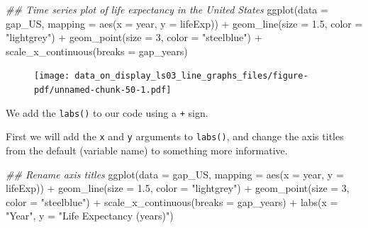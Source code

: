 \documentclass[
  letterpaper,
  DIV=11,
  numbers=noendperiod]{scrreprt}
\newenvironment{Shaded}{\begin{snugshade}}{\end{snugshade}}
\newcommand{\AttributeTok}[1]{\textcolor[rgb]{0.40,0.45,0.13}{#1}}
\newcommand{\DecValTok}[1]{\textcolor[rgb]{0.68,0.00,0.00}{#1}}
\newcommand{\DocumentationTok}[1]{\textcolor[rgb]{0.37,0.37,0.37}{\textit{#1}}}
\newcommand{\FloatTok}[1]{\textcolor[rgb]{0.68,0.00,0.00}{#1}}
\newcommand{\FunctionTok}[1]{\textcolor[rgb]{0.28,0.35,0.67}{#1}}
\newcommand{\NormalTok}[1]{\textcolor[rgb]{0.00,0.23,0.31}{#1}}
\newcommand{\SpecialCharTok}[1]{\textcolor[rgb]{0.37,0.37,0.37}{#1}}
\newcommand{\StringTok}[1]{\textcolor[rgb]{0.13,0.47,0.30}{#1}}
\begin{document}
\begin{Shaded}
\begin{Highlighting}[]
\DocumentationTok{\#\# Time series plot of life expectancy in the United States}
\FunctionTok{ggplot}\NormalTok{(}\AttributeTok{data =}\NormalTok{ gap\_US, }
       \AttributeTok{mapping =} \FunctionTok{aes}\NormalTok{(}\AttributeTok{x =}\NormalTok{ year, }
                     \AttributeTok{y =}\NormalTok{ lifeExp)) }\SpecialCharTok{+}
  \FunctionTok{geom\_line}\NormalTok{(}\AttributeTok{size =} \FloatTok{1.5}\NormalTok{, }
            \AttributeTok{color =} \StringTok{"lightgrey"}\NormalTok{) }\SpecialCharTok{+}
  \FunctionTok{geom\_point}\NormalTok{(}\AttributeTok{size =} \DecValTok{3}\NormalTok{, }
             \AttributeTok{color =} \StringTok{"steelblue"}\NormalTok{) }\SpecialCharTok{+}
  \FunctionTok{scale\_x\_continuous}\NormalTok{(}\AttributeTok{breaks =}\NormalTok{ gap\_years) }
\end{Highlighting}
\end{Shaded}

\begin{figure}[H]

{\centering \texttt{[image: data\_on\_display\_ls03\_line\_graphs\_files/figure-pdf/unnamed-chunk-50-1.pdf]}

}

\end{figure}

We add the \texttt{labs()} to our code using a \texttt{+} sign.

First we will add the \texttt{x} and \texttt{y} arguments to
\texttt{labs()}, and change the axis titles from the default (variable
name) to something more informative.

\begin{Shaded}
\begin{Highlighting}[]
\DocumentationTok{\#\# Rename axis titles}
\FunctionTok{ggplot}\NormalTok{(}\AttributeTok{data =}\NormalTok{ gap\_US, }
       \AttributeTok{mapping =} \FunctionTok{aes}\NormalTok{(}\AttributeTok{x =}\NormalTok{ year, }
                     \AttributeTok{y =}\NormalTok{ lifeExp)) }\SpecialCharTok{+}
  \FunctionTok{geom\_line}\NormalTok{(}\AttributeTok{size =} \FloatTok{1.5}\NormalTok{, }
            \AttributeTok{color =} \StringTok{"lightgrey"}\NormalTok{) }\SpecialCharTok{+}
  \FunctionTok{geom\_point}\NormalTok{(}\AttributeTok{size =} \DecValTok{3}\NormalTok{, }
             \AttributeTok{color =} \StringTok{"steelblue"}\NormalTok{) }\SpecialCharTok{+}
  \FunctionTok{scale\_x\_continuous}\NormalTok{(}\AttributeTok{breaks =}\NormalTok{ gap\_years) }\SpecialCharTok{+}
  \FunctionTok{labs}\NormalTok{(}\AttributeTok{x =} \StringTok{"Year"}\NormalTok{,}
       \AttributeTok{y =} \StringTok{"Life Expectancy (years)"}\NormalTok{)}
\end{Highlighting}
\end{Shaded}
\end{document}
